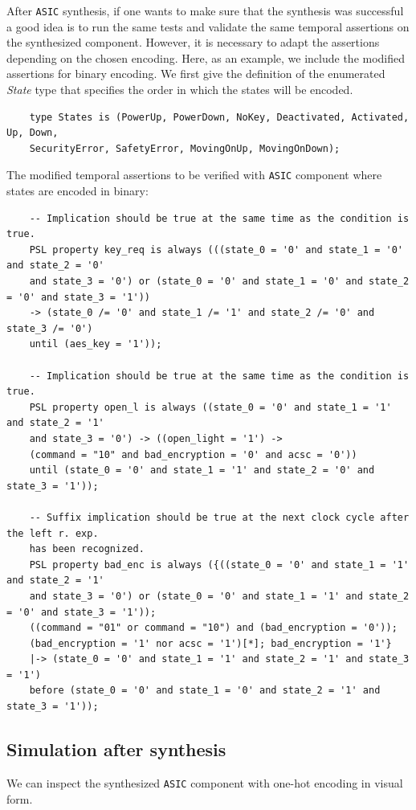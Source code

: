 \documentclass[a4paper,11pt]{article}
\begin{document}
    \par After \texttt{ASIC} synthesis, if one wants to make sure that the synthesis was successful a good idea is to run the same tests and validate the same temporal assertions on the synthesized component. However, it is necessary to adapt the assertions depending on the chosen encoding. Here, as an example, we include the modified assertions for binary encoding.	We first give the definition of the enumerated \textit{State} type that specifies the order in which the states will be encoded.
	\begin{verbatim}
    type States is (PowerUp, PowerDown, NoKey, Deactivated, Activated, Up, Down,
	SecurityError, SafetyError, MovingOnUp, MovingOnDown);
	\end{verbatim}
	The modified temporal assertions to be verified with \texttt{ASIC} component where states are encoded in binary:
	\begin{verbatim}
    -- Implication should be true at the same time as the condition is true.
    PSL property key_req is always (((state_0 = '0' and state_1 = '0' and state_2 = '0'
    and state_3 = '0') or (state_0 = '0' and state_1 = '0' and state_2 = '0' and state_3 = '1'))
    -> (state_0 /= '0' and state_1 /= '1' and state_2 /= '0' and state_3 /= '0')
    until (aes_key = '1'));

    -- Implication should be true at the same time as the condition is true.
    PSL property open_l is always ((state_0 = '0' and state_1 = '1' and state_2 = '1'
    and state_3 = '0') -> ((open_light = '1') ->
    (command = "10" and bad_encryption = '0' and acsc = '0'))
    until (state_0 = '0' and state_1 = '1' and state_2 = '0' and state_3 = '1'));

    -- Suffix implication should be true at the next clock cycle after the left r. exp.
    has been recognized.
    PSL property bad_enc is always ({((state_0 = '0' and state_1 = '1' and state_2 = '1'
    and state_3 = '0') or (state_0 = '0' and state_1 = '1' and state_2 = '0' and state_3 = '1'));
    ((command = "01" or command = "10") and (bad_encryption = '0'));
    (bad_encryption = '1' nor acsc = '1')[*]; bad_encryption = '1'}
    |-> (state_0 = '0' and state_1 = '1' and state_2 = '1' and state_3 = '1')
    before (state_0 = '0' and state_1 = '0' and state_2 = '1' and state_3 = '1'));
	\end{verbatim}

	\subsection{Simulation after synthesis}
	\par We can inspect the synthesized \texttt{ASIC} component with one-hot encoding in visual form.
\end{document}

